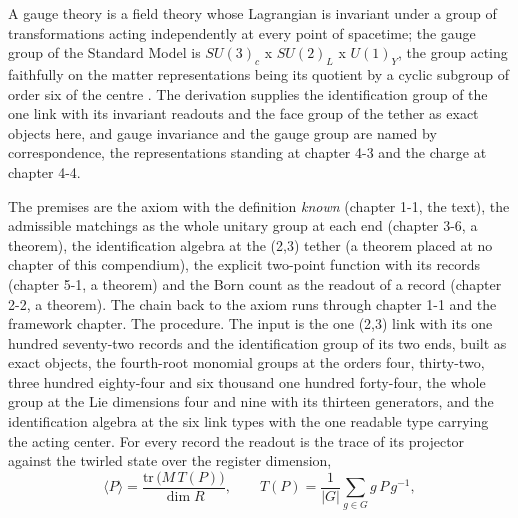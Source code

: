 \begin{chbridge}
A gauge theory is a field theory whose Lagrangian is invariant under a group of transformations acting independently at every point of spacetime; the gauge group of the Standard Model is $SU(3)_c$ x $SU(2)_L$ x $U(1)_Y$, the group acting faithfully on the matter representations being its quotient by a cyclic subgroup of order six of the centre \cite{YangMills1954,Weinberg1967,Baez2010}. The derivation supplies the identification group of the one link with its invariant readouts and the face group of the tether as exact objects here, and gauge invariance and the gauge group are named by correspondence, the representations standing at chapter 4-3 and the charge at chapter 4-4.
\end{chbridge}
\begin{chproof}
The premises are the axiom with the definition \emph{known} (chapter 1-1, the text), the admissible matchings as the whole unitary group at each end (chapter 3-6, a theorem), the identification algebra at the (2,3) tether (a theorem placed at no chapter of this compendium), the explicit two-point function with its records (chapter 5-1, a theorem) and the Born count as the readout of a record (chapter 2-2, a theorem). The chain back to the axiom runs through chapter 1-1 and the framework chapter. The procedure. The input is the one (2,3) link with its one hundred seventy-two records and the identification group of its two ends, built as exact objects, the fourth-root monomial groups at the orders four, thirty-two, three hundred eighty-four and six thousand one hundred forty-four, the whole group at the Lie dimensions four and nine with its thirteen generators, and the identification algebra at the six link types with the one readable type carrying the acting center. For every record the readout is the trace of its projector against the twirled state over the register dimension,
\begin{equation}
\langle P\rangle = \frac{\mathrm{tr}\,\big(M\,T(P)\big)}{\dim R},\qquad T(P) = \frac{1}{|G|}\sum_{g\in G} g\,P\,g^{-1} ,
\end{equation}

\end{chproof}
